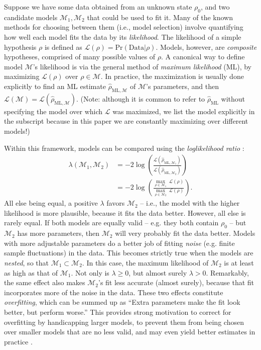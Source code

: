 \documentclass[aps,pra, twocolumn]{revtex4-1}
\newcommand{\M}{\mathcal{M}}
\newcommand{\cL}{\mathcal{L}}
\newcommand{\rhohat}{\hat{\rho}}
\newcommand{\rhoML}[1]{\rhohat_{\scriptscriptstyle{\mathrm{ML},#1}}}
\begin{document}
Suppose we have some data obtained from an unknown state $\rho_{0}$, and two candidate models $\M_{1}, \M_{2}$ that could be used to fit it.  Many of the known methods for choosing between them (i.e., model selection) involve quantifying how well each model fits the data by its \emph{likelihood}.  The likelihood of a simple hypothesis $\rho$ is defined as $\mathcal{L}(\rho) = \mathrm{Pr}(\mathrm{Data}|\rho)$.  Models, however, are \emph{composite} hypotheses, comprised of many possible values of $\rho$.  A canonical way to define model $\M$'s likelihood is via the general method of \emph{maximum likelihood} (ML), by maximizing $\cL(\rho)$ over $\rho\in\M$.  In practice, the maximization is usually done explicitly to find an ML estimate $\hat{\rho}_{\mathrm{ML},\M}$ \cite{Hradil1997, JamesPRA2001, Blume-Kohout2010} of $\M$'s parameters, and then $\cL(\M) = \cL(\hat{\rho}_{\mathrm{ML},\M})$.  (Note: although it is common to refer to $\hat\rho_{\mathrm{ML}}$ without specifying the model over which $\cL$ was maximized, we list the model explicitly in the subscript because in this paper we are constantly maximizing over different models!)

Within this framework, models can be compared using the \emph{loglikelihood ratio} \cite{Neyman1933, Blume-Kohout2010, Moroder2013}:
\begin{align}
\lambda(\M_{1}, \M_{2}) &= -2 \log \left(\frac{\cL(\rhoML{\M_{1}})}{\cL(\rhoML{\M_{2}})}\right)\\
&= -2 \log \left(\frac{\underset{\rho \in \M_{1}}{\max}~\cL(\rho)}{\underset{\rho \in \M_{2}}{\max}~\cL(\rho)}\right).
\end{align}
All else being equal, a positive $\lambda$ favors $\M_2$ -- i.e., the model with the higher likelihood is more plausible, because it fits the data better.  However, all else is rarely equal.  If both models are equally valid -- e.g. they both contain $\rho_0$ -- but $\M_2$ has more parameters, then $\M_2$ will very probably fit the data better.  Models with more adjustable parameters do a better job of fitting \emph{noise} (e.g. finite sample fluctuations) in the data.  This becomes strictly true when the models are \emph{nested}, so that $\M_{1} \subset \M_{2}$.  In this case, the maximum likelihood of $\M_{2}$ is at least as high as that of $\M_{1}$.  Not only is $\lambda \geq 0$, but almost surely $\lambda > 0$.  Remarkably, the same effect also makes $\M_{2}$'s fit less accurate (almost surely), because that fit incorporates more of the noise in the data.  These two effects constitute \emph{overfitting}, which can be summed up as ``Extra parameters make the fit look better, but perform worse.''  This provides strong motivation to correct for overfitting by handicapping larger models, to prevent them from being chosen over smaller models that are no less valid, and may even yield better estimates in practice \cite{Akaike1974}.
\end{document}
